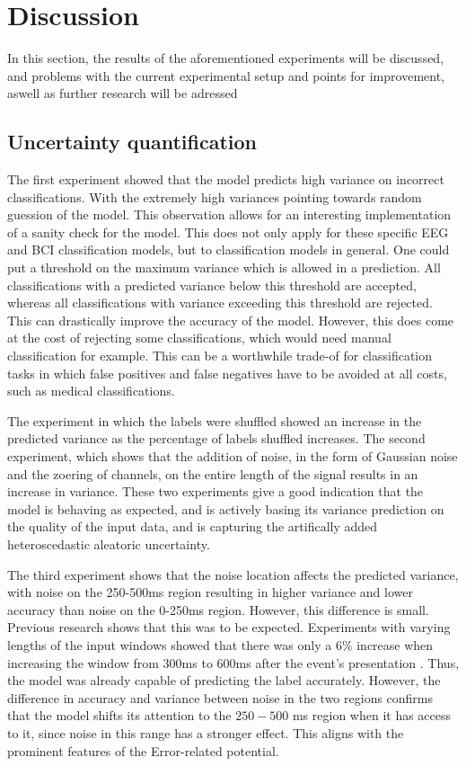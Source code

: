 \section{Discussion}\label{sec:discussion}

In this section, the results of the aforementioned experiments will be discussed, and problems with the current experimental setup and points for improvement, aswell as further research will be adressed

\subsection{Uncertainty quantification}

The first experiment showed that the model predicts high variance on incorrect classifications. With the extremely high variances pointing towards random guession of the model. This observation allows for an interesting implementation of a sanity check for the model. This does not only apply for these specific EEG and BCI classification models, but to classification models in general. One could put a threshold on the maximum variance which is allowed in a prediction. All classifications with a predicted variance below this threshold are accepted, whereas all classifications with variance exceeding this threshold are rejected. This can drastically improve the accuracy of the model. However, this does come at the cost of rejecting some classifications, which would need manual classification for example. This can be a worthwhile trade-of for classification tasks in which false positives and false negatives have to be avoided at all costs, such as medical classifications.

The experiment in which the labels were shuffled showed an increase in the predicted variance as the percentage of labels shuffled increases. The second experiment, which shows that the addition of noise, in the form of Gaussian noise and the zoering of channels, on the entire length of the signal results in an increase in variance. These two experiments give a good indication that the model is behaving as expected, and is actively basing its variance prediction on the quality of the input data, and is capturing the artifically added heteroscedastic aleatoric uncertainty.

The third experiment shows that the noise location affects the predicted variance, with noise on the 250-500ms region resulting in higher variance and lower accuracy than noise on the 0-250ms region. However, this difference is small. Previous research shows that this was to be expected. Experiments with varying lengths of the input windows showed that there was only a $6\%$ increase when increasing the window from $300$ms to $600$ms after the event's presentation \citep{correia2021error}. Thus, the model was already capable of predicting the label accurately. However, the difference in accuracy and variance between noise in the two regions confirms that the model shifts its attention to the $250-500$ ms region when it has access to it, since noise in this range has a stronger effect. This aligns with the prominent features of the Error-related potential.

